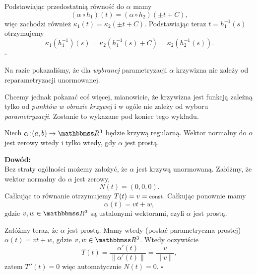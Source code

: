 \begin{frame}[<+->]


Podstawiając przedostatnią równość do $\alpha$ mamy 
\[(\alpha\circ h_1)(t)=(\alpha\circ h_2)(\pm t+C),\]
\pause więc zachodzi również $\kappa_1(t)=\kappa_2(\pm t+C)$. \pause Podstawiając teraz $t=h_1^{-1}(s)$ otrzymujemy 
\[\kappa_1(h_1^{-1})(s)=\kappa_2(h_1^{-1}(s)+C)=\kappa_2(h_2^{-1}(s)\!).\]
\hfill $\square$

\end{frame}
\begin{frame}

\begin{uwaga}
Na razie pokazaliśmy, że dla \textit{wybranej} parametryzacji $\alpha$ krzywizna nie zależy od reparametryzacji unormowanej.
\medskip

\pause Chcemy jednak pokazać coś więcej, mianowicie, że krzywizna jest funkcją zależną tylko od \textit{punktów w obrazie krzywej} i w ogóle nie zależy od wyboru \textit{parametryzacji}. Zostanie to wykazane pod koniec tego wykładu.
\end{uwaga}

\end{frame}
\begin{frame}

\begin{lemat}
Niech $\alpha\colon (a,b)\to \R^3$ będzie krzywą regularną. Wektor normalny do $\alpha$ jest zerowy wtedy i tylko wtedy, gdy $\alpha$ jest prostą.
\end{lemat}
\pause\textcolor{ared}{\textbf{Dowód:}}\\
Bez straty ogólności możemy założyć, że $\alpha$ jest krzywą unormowaną.
\pause Załóżmy, że wektor normalny do $\alpha$ jest zerowy, \[N(t)=(0,0,0).\] \pause Całkując to równanie otrzymujemy $T(t)=v=\text{\footnotesize{const}}$. \pause Całkując ponownie mamy \[\alpha(t)=vt+w,\] gdzie $v,w\in \R^3$ są ustalonymi wektorami, czyli $\alpha$ jest prostą.

\end{frame}
\begin{frame}[<+->]

Załóżmy teraz, że $\alpha$ jest prostą. \pause Mamy wtedy (postać parametryczna prostej) $\alpha(t)=vt+w$, gdzie $v,w\in \R^3$. \pause Wtedy oczywiście \[T(t)=\frac{\alpha'(t)}{\|\alpha'(t)\|}=\frac{v}{\|v\|},\] zatem $T\,'(t)=0$ więc automatycznie $N(t)=0$.
\hfill $\square$

\end{frame}
